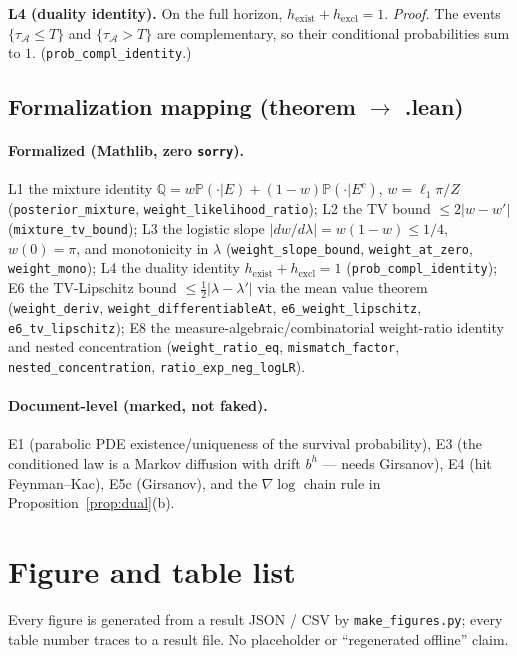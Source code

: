\documentclass[11pt]{article}
\newcommand{\Aregion}{\mathcal{A}}
\newcommand{\lean}[1]{\texttt{#1}}
\begin{document}
\textbf{L4 (duality identity).}
On the full horizon, $h_{\mathrm{exist}}+h_{\mathrm{excl}}=1$. \emph{Proof.} The events
$\{\tau_{\Aregion}\le T\}$ and $\{\tau_{\Aregion}>T\}$ are complementary, so their conditional
probabilities sum to $1$. (\lean{prob\_compl\_identity}.)

\subsection{Formalization mapping (theorem $\to$ .lean)}
\paragraph{Formalized (Mathlib, zero \texttt{sorry}).}
L1 the mixture identity $\mathbb Q=w\mathbb P(\cdot|E)+(1-w)\mathbb P(\cdot|E^c)$,
$w=\ell_1\pi/Z$ (\lean{posterior\_mixture}, \lean{weight\_likelihood\_ratio}); L2 the TV
bound $\le 2|w-w'|$ (\lean{mixture\_tv\_bound}); L3 the logistic slope
$|dw/d\lambda|=w(1-w)\le1/4$, $w(0)=\pi$, and monotonicity in $\lambda$
(\lean{weight\_slope\_bound}, \lean{weight\_at\_zero}, \lean{weight\_mono}); L4 the duality
identity $h_{\mathrm{exist}}+h_{\mathrm{excl}}=1$ (\lean{prob\_compl\_identity}); E6 the
TV-Lipschitz bound $\le\tfrac12|\lambda-\lambda'|$ via the mean value theorem
(\lean{weight\_deriv}, \lean{weight\_differentiableAt}, \lean{e6\_weight\_lipschitz},
\lean{e6\_tv\_lipschitz}); E8 the measure-algebraic/combinatorial weight-ratio identity and
nested concentration (\lean{weight\_ratio\_eq}, \lean{mismatch\_factor},
\lean{nested\_concentration}, \lean{ratio\_exp\_neg\_logLR}).

\paragraph{Document-level (marked, not faked).}
E1 (parabolic PDE existence/uniqueness of the survival probability), E3 (the conditioned law
is a Markov diffusion with drift $b^h$ --- needs Girsanov), E4 (hit Feynman--Kac), E5c
(Girsanov), and the $\nabla\log$ chain rule in Proposition~\ref{prop:dual}(b).

\section{Figure and table list}
\label{app:figures}
Every figure is generated from a result JSON / CSV by \texttt{make\_figures.py};
every table number traces to a result file. No placeholder or
``regenerated offline'' claim.
\end{document}
